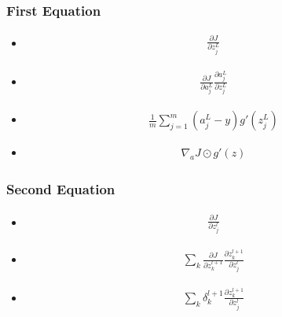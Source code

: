 \documentclass{beamer}
\begin{document}
\begin{frame}
    \frametitle{First Equation}

    \begin{itemize}[<+->]
        \item 
        \begin{gather*}
            \frac{\partial J}{\partial z^L_j}
        \end{gather*}
        \item 
        \begin{gather*}
            \frac{\partial J}{\partial a_j^L} \frac{\partial a_j^L}{\partial z_j^L}    
        \end{gather*}
        \item 
        \begin{gather*}
            \frac{1}{m}\sum_{j=1}^m(a_j^L - y)g'(z_j^L)
        \end{gather*}
        \item 
        \begin{gather*}
            \nabla_a J \odot g'(z)
        \end{gather*}
    \end{itemize}

\end{frame}

\begin{frame}
    \frametitle{Second Equation}

    \begin{itemize}[<+->]
        \item 
        \begin{gather*}
            \frac{\partial J}{\partial z^l_j}
        \end{gather*}
        \item 
        \begin{gather*}
            \sum_k\frac{\partial J}{\partial z_k^{l+1}} \frac{\partial z_k^{l+1}}{\partial z_j^{l}}    
        \end{gather*}
        \item 
        \begin{gather*}
            \sum_k\delta_k^{l+1}\frac{\partial z_k^{l+1}}{\partial z_j^{l}}
        \end{gather*}
        
    \end{itemize}

\end{frame}
\end{document}
